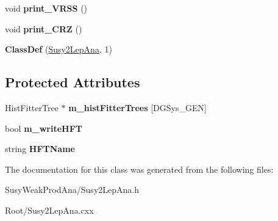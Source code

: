 \begin{DoxyCompactItemize}
\item 
\hypertarget{classSusy2LepAna_af4e0741b5f83f1e1843d5b52a2d79153}{
void {\bfseries print\_\-VRSS} ()}
\label{classSusy2LepAna_af4e0741b5f83f1e1843d5b52a2d79153}

\item 
\hypertarget{classSusy2LepAna_aec04d7ad73e705c21eaa19135237c3c6}{
void {\bfseries print\_\-CRZ} ()}
\label{classSusy2LepAna_aec04d7ad73e705c21eaa19135237c3c6}

\item 
\hypertarget{classSusy2LepAna_a62ec3a44d0b55bee59ab3ea72e869425}{
{\bfseries ClassDef} (\hyperlink{classSusy2LepAna}{Susy2LepAna}, 1)}
\label{classSusy2LepAna_a62ec3a44d0b55bee59ab3ea72e869425}

\end{DoxyCompactItemize}
\subsection*{Protected Attributes}
\begin{DoxyCompactItemize}
\item 
\hypertarget{classSusy2LepAna_ad0141ca9740e4671a0b8e14127b3878e}{
HistFitterTree $\ast$ {\bfseries m\_\-histFitterTrees} \mbox{[}DGSys\_\-GEN\mbox{]}}
\label{classSusy2LepAna_ad0141ca9740e4671a0b8e14127b3878e}

\item 
\hypertarget{classSusy2LepAna_a2c84893e90fc06d4ee53e0d1929b1636}{
bool {\bfseries m\_\-writeHFT}}
\label{classSusy2LepAna_a2c84893e90fc06d4ee53e0d1929b1636}

\item 
\hypertarget{classSusy2LepAna_ac2de9c96ade4fd1b6b1adf714eae0f9c}{
string {\bfseries HFTName}}
\label{classSusy2LepAna_ac2de9c96ade4fd1b6b1adf714eae0f9c}

\end{DoxyCompactItemize}


The documentation for this class was generated from the following files:\begin{DoxyCompactItemize}
\item 
SusyWeakProdAna/Susy2LepAna.h\item 
Root/Susy2LepAna.cxx\end{DoxyCompactItemize}
